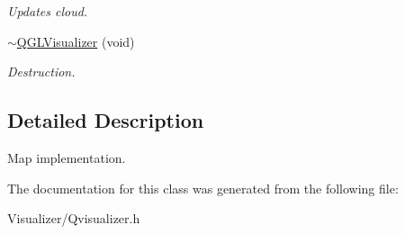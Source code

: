 \begin{DoxyCompactItemize}
\begin{DoxyCompactList}\small\item\em Updates cloud. \end{DoxyCompactList}\item 
\hyperlink{classQGLVisualizer_a7ad8fe9531404411e1bc908f7d07edc0}{$\sim$\+Q\+G\+L\+Visualizer} (void)\hypertarget{classQGLVisualizer_a7ad8fe9531404411e1bc908f7d07edc0}{}\label{classQGLVisualizer_a7ad8fe9531404411e1bc908f7d07edc0}

\begin{DoxyCompactList}\small\item\em Destruction. \end{DoxyCompactList}\end{DoxyCompactItemize}


\subsection{Detailed Description}
Map implementation. 

The documentation for this class was generated from the following file\+:\begin{DoxyCompactItemize}
\item 
Visualizer/Qvisualizer.\+h\end{DoxyCompactItemize}
